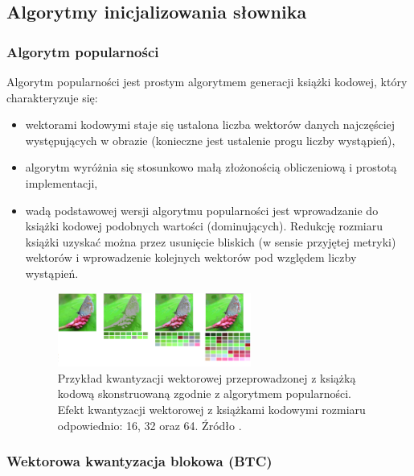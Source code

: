 \documentclass{article}
\begin{document}
\subsection{Algorytmy inicjalizowania słownika}

\subsubsection{Algorytm popularności}

Algorytm popularności jest prostym algorytmem generacji książki kodowej, który charakteryzuje się:

\begin{itemize}
  \item wektorami kodowymi staje się ustalona liczba wektorów danych najczęściej występujących 
    w obrazie (konieczne jest ustalenie progu liczby wystąpień),
  \item algorytm wyróżnia się stosunkowo małą złożonością obliczeniową i prostotą implementacji,
  \item wadą podstawowej wersji algorytmu popularności jest wprowadzanie do książki kodowej podobnych wartości (dominujących). 
    Redukcję rozmiaru książki uzyskać można przez usunięcie bliskich (w sensie przyjętej metryki) wektorów i 
    wprowadzenie kolejnych wektorów pod względem liczby wystąpień.

\begin{figure}[H]
    \centering
    \includegraphics[width=0.6\textwidth]{images/motyle_2.png}
    \caption{Przykład kwantyzacji wektorowej przeprowadzonej z książką kodową skonstruowaną zgodnie z algorytmem popularności.
      Efekt kwantyzacji wektorowej z książkami kodowymi rozmiaru odpowiednio: 16, 32 oraz 64. Źródło \cite{aprzelaskowski}.}
    \label{fig:motyle_2}
\end{figure}
 
\end{itemize}

\subsubsection{Wektorowa kwantyzacja blokowa (BTC)}
\end{document}
